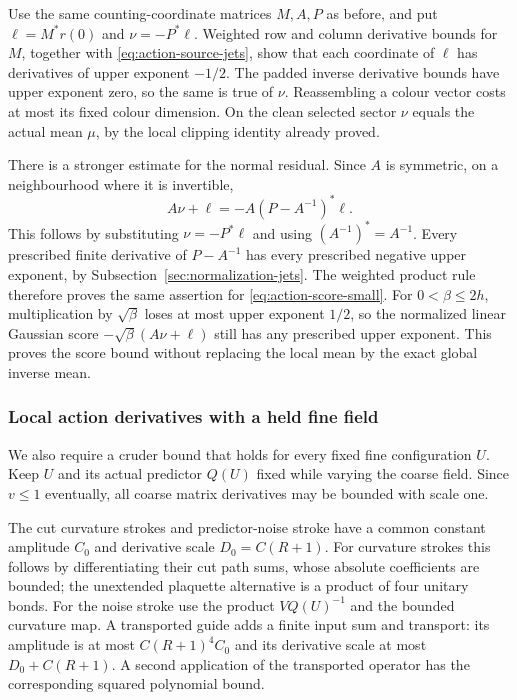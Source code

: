 Use the same counting-coordinate matrices $M,A,P$ as before, and
put $\ell=M^*r(0)$ and $\nu=-P^*\ell$. Weighted row and column
derivative bounds for $M$, together with
\eqref{eq:action-source-jets}, show that each coordinate of $\ell$
has derivatives of upper exponent $-1/2$. The padded inverse
derivative bounds have upper exponent zero, so the same is true
of $\nu$. Reassembling a colour vector costs at most its fixed
colour dimension. On the clean selected sector $\nu$ equals the
actual mean $\mu$, by the local clipping identity already proved.

There is a stronger estimate for the normal residual. Since $A$
is symmetric, on a neighbourhood where it is invertible,
\begin{equation}\label{eq:action-score-small}
 A\nu+\ell=-A(P-A^{-1})^*\ell.
\end{equation}
This follows by substituting $\nu=-P^*\ell$ and using
$(A^{-1})^*=A^{-1}$. Every prescribed finite derivative of
$P-A^{-1}$ has every prescribed negative upper exponent, by
Subsection~\ref{sec:normalization-jets}. The weighted product rule
therefore proves the same assertion for \eqref{eq:action-score-small}.
For $0<\beta\le2h$, multiplication by $\sqrt\beta$ loses at most
upper exponent $1/2$, so the normalized linear Gaussian score
$-\sqrt\beta(A\nu+\ell)$ still has any prescribed upper exponent.
This proves the score bound without replacing the local mean by
the exact global inverse mean.

\subsubsection{Local action derivatives with a held fine field}
We also require a cruder bound that holds for every fixed fine
configuration $U$. Keep $U$ and its actual predictor $Q(U)$ fixed
while varying the coarse field. Since $v\le1$ eventually, all
coarse matrix derivatives may be bounded with scale one.

The cut curvature strokes and predictor-noise stroke have a common
constant amplitude $C_0$ and derivative scale $D_0=C(R+1)$.
For curvature strokes this follows by differentiating their cut
path sums, whose absolute coefficients are bounded; the unextended
plaquette alternative is a product of four unitary bonds. For the
noise stroke use the product $VQ(U)^{-1}$ and the bounded curvature
map. A transported guide adds a finite input sum and transport:
its amplitude is at most $C(R+1)^4C_0$ and its derivative scale
at most $D_0+C(R+1)$. A second application of the transported
operator has the corresponding squared polynomial bound.

